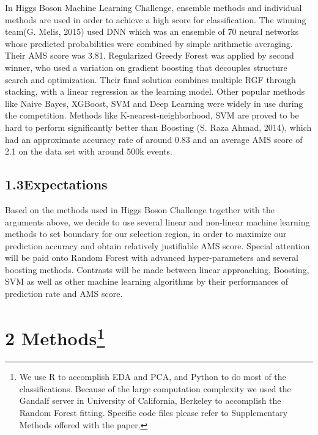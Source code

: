 \documentclass[11pt]{article}
\begin{document}
In Higgs Boson Machine Learning Challenge, ensemble methods and individual methods are used in order to achieve a high score for classification. The winning team(G. Melis, 2015) used DNN which was an ensemble of 70 neural networks whose predicted probabilities were combined by simple arithmetic averaging. Their AMS score was 3.81. Regularized Greedy Forest was applied by second winner, who used a variation on gradient boosting that decouples structure search and optimization. Their final solution combines multiple RGF through stacking, with a linear regression as the learning model. Other popular methods like Naive Bayes, XGBoost, SVM and Deep Learning were widely in use during the competition. Methods like K-nearest-neighborhood, SVM are proved to be hard to perform significantly better than Boosting (S. Raza Ahmad, 2014), which had an approximate accuracy rate of around 0.83 and an average AMS score of 2.1 on the data set with around 500k events. 

\subsection*{1.3\quad Expectations}

Based on the methods used in Higgs Boson Challenge together with the arguments above, we decide to use several linear and non-linear machine learning methods to set boundary for our selection region, in order to maximize our prediction accuracy and obtain relatively justifiable AMS score. Special attention will be paid onto Random Forest with advanced hyper-parameters and several boosting methods. Contrasts will be made between linear approaching, Boosting, SVM as well as other machine learning algorithms by their performances of prediction rate and AMS score.

\vspace{30pt}

\section*{2 \quad Methods\footnote{We use R to accomplish EDA and PCA, and Python to do most of the classifications. Because of the large computation complexity we used the Gandalf server in University of California, Berkeley to accomplish the Random Forest fitting. Specific code files please refer to Supplementary Methods offered with the paper.}}
\end{document}
